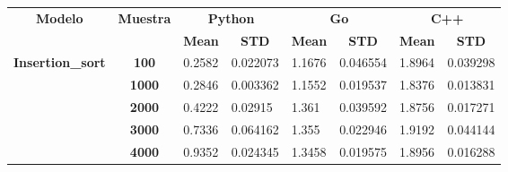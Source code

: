 \documentclass{article}
\begin{document}
\begin{table}[]
\begin{tabular}{|c|c|ll|ll|ll|}
\hline
\multirow{2}{*}{\textbf{Modelo}}           & \multirow{2}{*}{\textbf{Muestra}} & \multicolumn{2}{c|}{\textbf{Python}}                                   & \multicolumn{2}{c|}{\textbf{Go}}                                       & \multicolumn{2}{c|}{\textbf{C++}}                                      \\ \cline{3-8} 
                                           &                                   & \multicolumn{1}{c|}{\textbf{Mean}} & \multicolumn{1}{c|}{\textbf{STD}} & \multicolumn{1}{c|}{\textbf{Mean}} & \multicolumn{1}{c|}{\textbf{STD}} & \multicolumn{1}{c|}{\textbf{Mean}} & \multicolumn{1}{c|}{\textbf{STD}} \\ \hline
\multirow{15}{*}{\textbf{Insertion\_sort}} & \textbf{100}                      & \multicolumn{1}{l|}{0.2582}        & 0.022073                          & \multicolumn{1}{l|}{1.1676}        & 0.046554                          & \multicolumn{1}{l|}{1.8964}        & 0.039298                          \\ \cline{2-8} 
                                           & \textbf{1000}                     & \multicolumn{1}{l|}{0.2846}        & 0.003362                          & \multicolumn{1}{l|}{1.1552}        & 0.019537                          & \multicolumn{1}{l|}{1.8376}        & 0.013831                          \\ \cline{2-8} 
                                           & \textbf{2000}                     & \multicolumn{1}{l|}{0.4222}        & 0.02915                           & \multicolumn{1}{l|}{1.361}         & 0.039592                          & \multicolumn{1}{l|}{1.8756}        & 0.017271                          \\ \cline{2-8} 
                                           & \textbf{3000}                     & \multicolumn{1}{l|}{0.7336}        & 0.064162                          & \multicolumn{1}{l|}{1.355}         & 0.022946                          & \multicolumn{1}{l|}{1.9192}        & 0.044144                          \\ \cline{2-8} 
                                           & \textbf{4000}                     & \multicolumn{1}{l|}{0.9352}        & 0.024345                          & \multicolumn{1}{l|}{1.3458}        & 0.019575                          & \multicolumn{1}{l|}{1.8956}        & 0.016288                          \\ \cline{2-8} 

\end{tabular}
\end{table}
\end{document}

